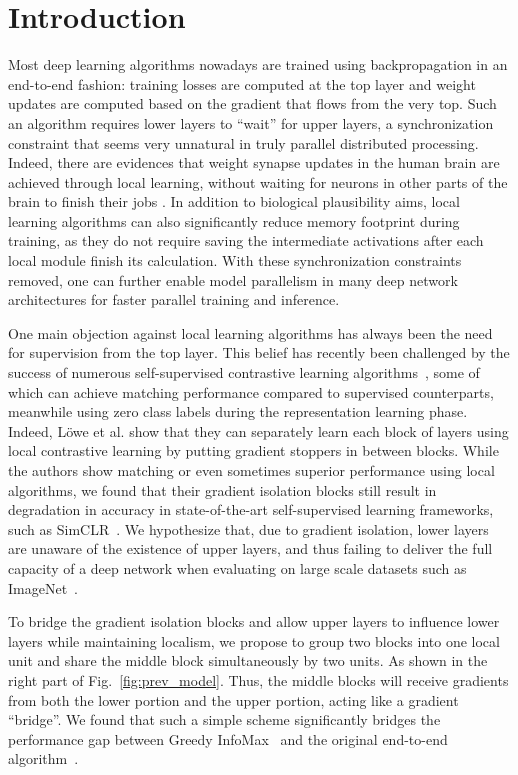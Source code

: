 \section{Introduction}

Most deep learning algorithms nowadays are trained using backpropagation in an end-to-end fashion:
training losses are computed at the top layer and weight updates are computed based on the gradient
that flows from the very top. Such an algorithm requires lower layers to ``wait'' for upper layers,
a synchronization constraint that seems very unnatural in truly parallel distributed processing.
Indeed, there are evidences that weight synapse updates in the human brain are achieved through
local learning, without waiting for neurons in other parts of the brain to finish their jobs
\cite{caporale2008spike,ystdp}. In addition to biological plausibility aims, local learning
algorithms can also significantly reduce memory footprint during training, as they do not require
saving the intermediate activations after each local module finish its calculation. With these synchronization constraints removed, one can further
enable model parallelism in many deep network architectures \cite{pipedream} for faster parallel
training and inference.

One main objection against local learning algorithms has always been the need for supervision from
the top layer. This belief has  recently been challenged by the success of numerous self-supervised
contrastive learning algorithms~\cite{cmc,moco,pirl,simclr}, some of which can achieve matching
performance compared to supervised counterparts, meanwhile using zero class labels during the
representation learning phase. Indeed, L{\"{o}}we et al. \cite{e2e2e} show that they can separately
learn each block of layers using local contrastive learning by putting gradient stoppers in between
blocks. While the authors show matching or even sometimes superior performance using local
algorithms, we found that their gradient isolation blocks still result in degradation in accuracy in
state-of-the-art self-supervised learning frameworks, such as SimCLR~\cite{simclr}. We hypothesize
that, due to gradient isolation, lower layers are unaware of the existence of upper layers, and thus
failing to deliver the full capacity of a deep network when evaluating on large scale datasets such
as ImageNet~\cite{deng2009imagenet}.

To bridge the gradient isolation blocks and allow upper layers to influence lower layers while
maintaining localism, we propose to group two blocks into one local unit and share the middle block
simultaneously by two units. As shown in the right part of Fig.~\ref{fig:prev_model}. Thus, the
middle blocks will receive gradients from both the lower portion and the upper portion, acting like
a gradient ``bridge''. We found that such a simple scheme significantly bridges the performance gap
between Greedy InfoMax~\cite{e2e2e} and the original end-to-end algorithm~\cite{simclr}.



